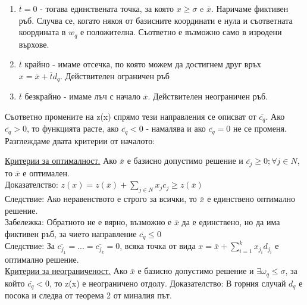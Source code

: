 \documentclass[12pt, a4paper]{article}
\begin{document}
\begin{enumerate}
	\item $\overline{t} = 0$ - тогава единствената точка, за която $x\geq\sigma$ e $\overline{x}$. Наричаме фиктивен ръб. Случва се, когато някоя от базисните координати е нула и съответната координата в $w_q$ е положителна. Съответно е възможно само в изродени върхове.
	\item $\overline{t}$ крайно - имаме отсечка, по която можем да достигнем друг връх $x = \overline{x}+\overline{t}d_q$. Действителен ограничен ръб
	\item $\overline{t}$ безкрайно - имаме лъч с начало $\overline{x}$. Действителен неограничен ръб.
\end{enumerate}

Съответно промените на z(x) спрямо тези направления се описват от $\overline{c_q}$. Ако $\overline{c_q} > 0$, то функцията расте, ако $\overline{c_q} < 0$ - намалява и ако $\overline{c_q} = 0$ не се променя.\\

Разглеждаме двата критерии от началото:

\underline{Критерии за оптималност.} Ако $\overline{x}$ е базисно допустимо решение и $\overline{c_j}\geq0; \forall j\in N$, то $\overline{x}$ е оптимален.\\
Доказателство: $z(x) = z(\overline{x}) + \sum_{j\in N}x_jc_j\geq z(\overline{x})$\\
Следствие: Ако неравенството е строго за всички, то $\overline{x}$ е единствено оптимално решение.\\
Забележка: Обратното не е вярно, възможно е $\overline{x}$ да е единствено, но да има фиктивен ръб, за чието направление $\overline{c_q} \leq 0$\\
Следствие: За $\overline{c_{j_1}} = ... = \overline{c_{j_k}} = 0$, всяка точка от вида $x = \overline{x} + \sum_{i=1}^k x_{j_i}d_{j_i}$ е оптимално решение.\\

\underline{Критерии за неограниченост.} Ако $\overline{x}$ е базисно допустимо решение и $\exists \omega_q\leq\sigma$, за който $\overline{c_q}<0$, то z(x) е неограничено отдолу.
Доказателство: В горния случай $d_q$ е посока и следва от теорема 2 от миналия път.
\end{document}
